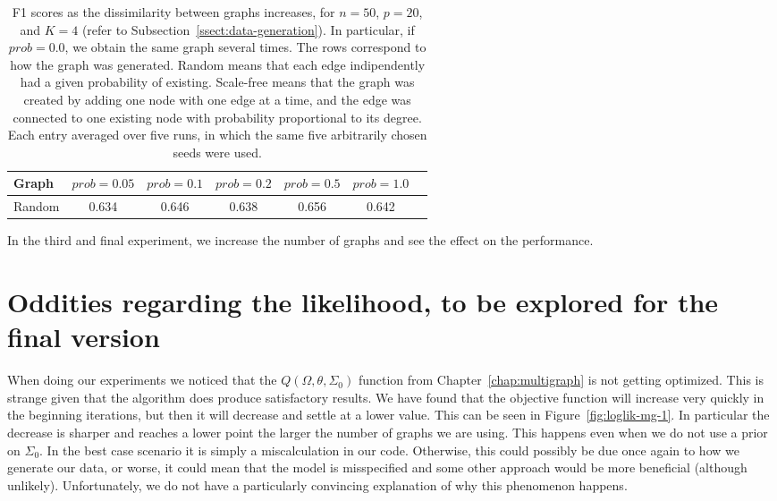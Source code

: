 \documentclass[a4paper, 11pt, oneside]{report}
\newcommand{\1}{\mathds{1}}
\begin{document}
\begin{table}[ht]
	\caption{F1 scores as the dissimilarity between graphs increases, for $n=50$, $p=20$, and $K=4$ (refer to Subsection~\ref{ssect:data-generation}).
		In particular, if $prob = 0.0$, we obtain the same graph several times.
		The rows correspond to how the graph was generated.
		Random means that each edge indipendently had a given probability of existing.
		Scale-free means that the graph was created by adding one node with one edge at a time, and the edge was connected to one existing node with probability proportional to its degree.
		Each entry averaged over five runs, in which the same five arbitrarily chosen seeds were used.
	}
	\label{tab:mg-more-random}
	\begin{center}
		\begin{tabular}[c]{l|cccccc}
			\toprule
			Graph  & $prob = 0.05$ & $prob = 0.1$ & $prob = 0.2$ & $prob = 0.5$ & $prob = 1.0$ \\
			\midrule
			Random & 0.634         & 0.646        & 0.638        & 0.656        & 0.642        \\
			\bottomrule
		\end{tabular}
	\end{center}
\end{table}

In the third and final experiment, we increase the number of graphs and see the effect on the performance.
\section{Oddities regarding the likelihood, to be explored for the final version}
When doing our experiments we noticed that the $Q(\Omega, \theta, \Sigma_0)$ function from Chapter~\ref{chap:multigraph}
is not getting optimized. This is strange given that the algorithm does produce satisfactory results.
We have found that the objective function will increase very quickly in the beginning iterations,
but then it will decrease and settle at a lower value. This can be seen in Figure~\ref{fig:loglik-mg-1}.
In particular the decrease is sharper and reaches a lower point the larger the number of graphs we are using.
This happens even when we do not use a prior on $\Sigma_0$.
In the best case scenario it is simply a miscalculation in our code.
Otherwise, this could possibly be due once again to how we generate our data, or worse,
it could mean that the model is misspecified and some other approach would be more beneficial (although unlikely).
Unfortunately, we do not have a particularly convincing explanation of why this phenomenon happens.
\end{document}
